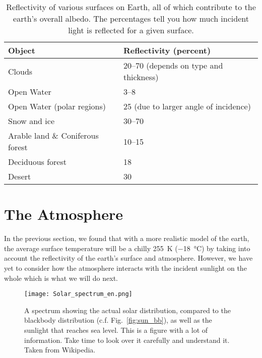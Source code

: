     \begin{table}[ht]
    \centering
    \begin{tabular}{|p{5cm}|p{6cm}|}
        \hline
        \textbf{Object}     & \textbf{Reflectivity (percent)}\\
        \hline
        Clouds & 20--70 (depends on type and thickness) \\
        Open Water  & 3--8 \\
        Open Water (polar regions) & 25 (due to larger angle of incidence) \\
        Snow and ice   & 30--70 \\
        Arable land \& Coniferous forest & 10--15 \\
        Deciduous forest  & 18   \\
        Desert & 30  \\
        \hline
    \end{tabular}
    \caption{Reflectivity of various surfaces on Earth, all of which contribute to the earth's overall albedo.\cite{thorndike1976energy} The percentages tell you how much incident light is reflected for a given surface.}  
    \label{tab:albedo}     
    \end{table}


    
   \section{The Atmosphere} %
   \label{sec:the_atmosphere}
    
    In the previous section, we found that with a more realistic model of the earth, the average surface temperature will be a chilly \SI{255}{\kelvin} (\SI{-18}{\celsius}) by taking into account the reflectivity of the earth's surface and atmosphere. However, we have yet to consider how the atmosphere interacts with the incident sunlight on the whole which is what we will do next.

    \begin{figure}[ht]
        \centering 
        \texttt{[image: Solar\_spectrum\_en.png]}
        \caption{A spectrum showing the actual solar distribution, compared to the blackbody distribution (c.f. Fig.~\ref{fig:sun_bb}), as well as the sunlight that reaches sea level. This is a figure with a lot of information. Take time to look over it carefully and understand it. Taken from Wikipedia.}
        \label{fig:solar_spec}
    \end{figure}

